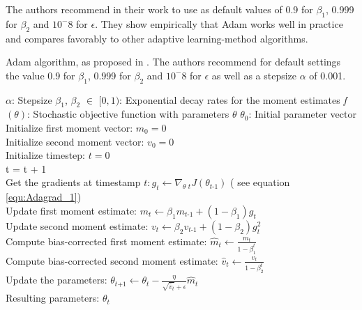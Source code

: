 \documentclass[12pt,oneside,a4paper,parskip]{scrbook}
\begin{document}
The authors recommend in their work to use as default values of 0.9 for $\beta_1$, 0.999 for $\beta_2$ and $10^-8$ for $\epsilon$.
They show empirically that Adam works well in practice and compares favorably to other adaptive learning-method algorithms.
\cite{overvieDiffRSLVQ, Kingma2014AdamAM}

\begin{algorithm}
  \caption{Adam algorithm, as proposed in \cite{Kingma2014AdamAM}. The authors recommend for default settings the value
          0.9 for $\beta_1$, 0.999 for $\beta_2$ and $10^-8$ for $\epsilon$ as well as a stepsize $\alpha$ of 0.001.}\label{euclid}
  \begin{algorithmic}[1]
    \Require $\alpha$: Stepsize
    \Require $\beta_1$, $\beta_2$ $\in$ $[0,1)$: Exponential decay rates for the moment estimates
    \Require \textit{f}$(\theta)$: Stochastic objective function with parameters $\theta$
    \Require $\theta_0$: Initial parameter vector \\
    Initialize first moment vector: $m_0 = 0$ \\
    Initialize second moment vector: $v_0 = 0$ \\
    Initialize timestep: $t = 0$ 
     \\
      t = t + 1 \\
      Get the gradients at timestamp $\textit{t}: \textit{g}_t \leftarrow \nabla_\textit{$\theta$ t}\textit{J}(\theta_\textit{t-1})$ ( see equation \ref{equ:Adagrad_1}) \\
      Update first moment estimate: $\textit{m}_t \leftarrow \beta_1\textit{m}_\textit{t-1} + (1-\beta_1)\textit{g}_t$ \\
      Update second moment estimate: $\textit{v}_t \leftarrow \beta_2\textit{v}_\textit{t-1} + (1-\beta_2)\textit{g}^2_t$ \\
      Compute bias-corrected first moment estimate: $\hat{m}_t \leftarrow \frac{\textit{m}_t}{1-\beta^t_1}$ \\
      Compute bias-corrected second moment estimate: $\hat{v}_t \leftarrow \frac{\textit{v}_t}{1-\beta^t_2}$ \\
      Update the parameters: $\theta_\textit{t+1} \leftarrow \theta_\textit{t}-\frac{\eta}{\sqrt{\hat{v}_t}+ \epsilon} \hat{m}_t$ \\
    \EndWhile
    \Return Resulting parameters: $\theta_t$
  \end{algorithmic}
\end{algorithm}
\end{document}
